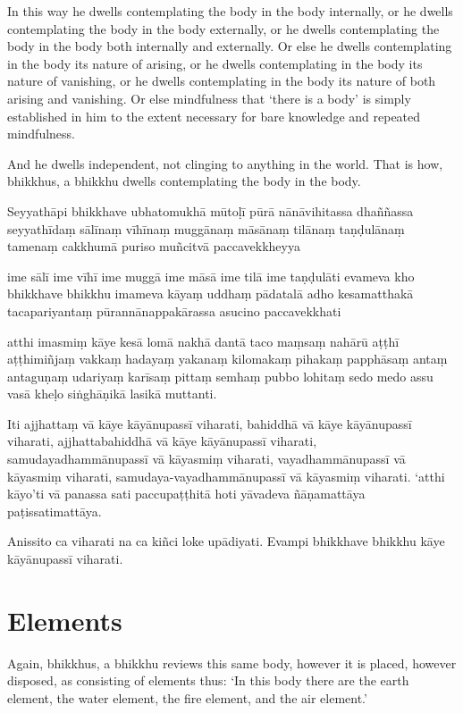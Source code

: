 In this way he dwells contemplating the body in the body internally, or he
dwells contemplating the body in the body externally, or he dwells contemplating
the body in the body both internally and externally. Or else he dwells
contemplating in the body its nature of arising, or he dwells contemplating in
the body its nature of vanishing, or he dwells contemplating in the body its
nature of both arising and vanishing. Or else mindfulness that ‘there is a body’
is simply established in him to the extent necessary for bare knowledge and
repeated mindfulness.

And he dwells independent, not clinging to anything in the world. That is how,
bhikkhus, a bhikkhu dwells contemplating the body in the body.


\paliPage

Seyyathāpi bhikkhave ubhatomukhā mūtoḷī pūrā nānāvihitassa dhaññassa seyyathīdaṃ
sālīnaṃ vīhīnaṃ muggānaṃ māsānaṃ tilānaṃ taṇḍulānaṃ tamenaṃ cakkhumā puriso
muñcitvā paccavekkheyya

ime sālī ime vīhī ime muggā ime māsā ime tilā ime taṇḍulāti evameva kho
bhikkhave bhikkhu imameva kāyaṃ uddhaṃ pādatalā adho kesamatthakā tacapariyantaṃ
pūrannānappakārassa asucino paccavekkhati

atthi imasmiṃ kāye kesā lomā nakhā dantā taco maṃsaṃ nahārū aṭṭhī aṭṭhimiñjaṃ
vakkaṃ hadayaṃ yakanaṃ kilomakaṃ pihakaṃ papphāsaṃ antaṃ antaguṇaṃ udariyaṃ
karīsaṃ pittaṃ semhaṃ pubbo lohitaṃ sedo medo assu vasā kheḷo siṅghāṇikā lasikā
muttanti.

Iti ajjhattaṃ vā kāye kāyānupassī viharati, bahiddhā vā kāye kāyānupassī
viharati, ajjhattabahiddhā vā kāye kāyānupassī viharati, samudayadhammānupassī
vā kāyasmiṃ viharati, vayadhammānupassī vā kāyasmiṃ viharati,
samudaya-vayadhammānupassī vā kāyasmiṃ viharati. `atthi kāyo'ti vā panassa sati
paccupaṭṭhitā hoti yāvadeva ñāṇamattāya paṭissatimattāya.

Anissito ca viharati na ca kiñci loke upādiyati. Evampi bhikkhave bhikkhu kāye
kāyānupassī viharati.


\englishPage
\section{Elements}

Again, bhikkhus, a bhikkhu reviews this same body, however it is placed, however
disposed, as consisting of elements thus: `In this body there are the earth
element, the water element, the fire element, and the air element.'


